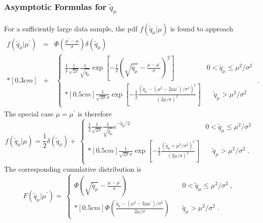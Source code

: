 \subsubsection{Asymptotic Formulas for $\tilde q_{\mu}$}
\label{sec:tildeqmu} 

For a sufficiently large data sample,  the pdf $f(\tilde{q}_{\mu} | \mu)$ is found to approach
\begin{eqnarray}
\label{eq:ftildeqmmp} 
f(\tilde{q}_{\mu}|\mu^{\prime}) & = & 
\Phi \left( \frac{\mu^{\prime} - \mu}{\sigma} \right) 
\delta (\tilde{q}_{\mu}) \nonumber \\*[0.3 cm] 
& + &
 \: \left\{ \! \! \begin{array}{lll}
\frac{1}{2} \frac{1}{\sqrt{2 \pi}} \frac{1}{\sqrt{\tilde{q}_{\mu}}}
\exp \left[ -\frac{1}{2} \left( \sqrt{\tilde{q}_{\mu}} -
\frac{\mu - \mu^{\prime}}{\sigma} \right)^2 \right]
                 & 0 < \tilde{q}_{\mu} \le \mu^2/\sigma^{2}  \\*[0.5 cm]
\frac{1}{\sqrt{2 \pi} \sigma} \exp \left[
-\frac{1}{2} \frac{ (\tilde{q}_{\mu} - 
(\mu^2 - 2 \mu \mu^{\prime})/\sigma^{2} )^2 }
{(2 \mu/\sigma)^2} \right] 
                 &  \quad \tilde{q}_{\mu} > \mu^2/\sigma^{2} 
              \end{array}
       \right.
\;.
\end{eqnarray}
The special case $\mu = \mu^{\prime}$ is therefore
\begin{equation}
\label{eq:ftildeqmm} 
f(\tilde{q}_{\mu}|\mu) = 
\frac{1}{2} \delta (\tilde{q}_{\mu}) +
 \: \left\{ \! \! \begin{array}{lll}
\frac{1}{2} \frac{1}{\sqrt{2 \pi}} \frac{1}{\sqrt{\tilde{q}_{\mu}}}
e^{- \tilde{q}_{\mu}/2}
                 & 0 < \tilde{q}_{\mu} \le \mu^2/\sigma^2  \\*[0.5 cm]
\frac{1}{\sqrt{2 \pi} \sigma} \exp \left[
-\frac{1}{2} \frac{ (\tilde{q}_{\mu} + \mu^2/\sigma^2 )^2 }
{(2 \mu/\sigma)^2} \right] 
                 &  \quad \tilde{q}_{\mu} > \mu^2/\sigma^2 \;.
              \end{array}
       \right.
\end{equation}
The corresponding cumulative distribution is
\begin{equation}
\label{eq:tildeqmmpcdf} 
F(\tilde{q}_{\mu}|\mu^{\prime}) = 
 \: \left\{ \! \! \begin{array}{lll}
\Phi\left( \sqrt{\tilde{q}_{\mu}} - 
\frac{\mu - \mu^{\prime}}{\sigma} \right)
                 & \quad 0 < \tilde{q}_{\mu} \le \mu^2/\sigma^{2}  
\;, \\*[0.5 cm]
\Phi \left( \frac{ \tilde{q}_{\mu} - 
(\mu^2 - 2 \mu \mu^{\prime})/\sigma^{2}}
{2\mu/\sigma} \right)
                 &  \quad \tilde{q}_{\mu} > \mu^2/\sigma^{2} \;.
              \end{array}
       \right.
\end{equation}



